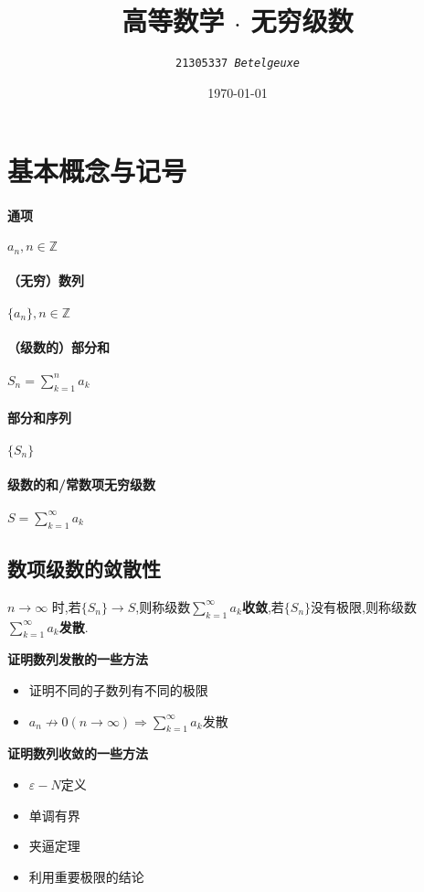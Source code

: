 \documentclass[UTF8]{ctexart}
\title{\zihao{1}高等数学 $\cdot$ 无穷级数}
\author{\tt 21305337 \it  Betelgeuxe}
\date{\kaishu\today}
\newenvironment{itemizer}{\begin{itemize}}{\end{itemize}}
\newenvironment{itemizeg}{\begin{itemize}}{\end{itemize}}
\begin{document}
\everymath{\displaystyle}
\maketitle
\tableofcontents
\newpage
{}
\section{基本概念与记号}
\paragraph{通项}$a_n,n\in\mathbb{Z}$
\paragraph{（无穷）数列}$\{a_n\},n\in\mathbb{Z}$
\paragraph{（级数的）部分和}$S_n=\sum_{k=1}^na_k$
\paragraph{部分和序列}$\{S_n\}$
\paragraph{级数的和/常数项无穷级数}$S=\sum_{k=1}^\infty a_k$
\subsection{数项级数的敛散性}
\noindent $n\rightarrow\infty$ 时,若$\{S_n\}\rightarrow S$,则称级数$\sum_{k=1}^\infty a_k$\textbf{收敛},若$\{S_n\}$没有极限,则称级数$\sum_{k=1}^\infty a_k$\textbf{发散}.

\noindent\textbf{证明数列发散的一些方法}
\begin{itemizeg}
\item 证明不同的子数列有不同的极限
\item $a_n\not\rightarrow 0(n\rightarrow\infty)\Longrightarrow\sum_{k=1}^\infty a_k\text{发散}$
\end{itemizeg}

\noindent\textbf{证明数列收敛的一些方法}
\begin{itemizer}
\item $\varepsilon-N$定义
\item 单调有界
\item 夹逼定理
\item 利用重要极限的结论
\end{itemizer}
\end{document}
